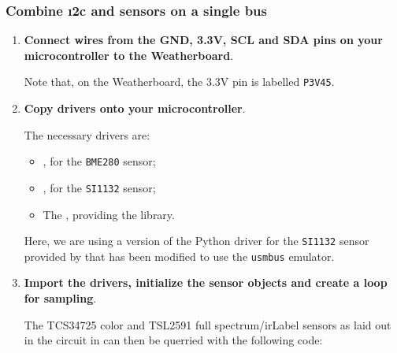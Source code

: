 \subsubsection{\howto Combine \i2c and \smbus sensors on a single bus}
\begin{enumerate}
	\item \textbf{Connect wires from the GND, 3.3V, SCL and SDA pins on your microcontroller to the Weatherboard}.

	Note that, on the Weatherboard, the 3.3V pin is labelled \texttt{P3V45}.

	\item \textbf{Copy drivers onto your microcontroller}.

	The necessary drivers are:
	\begin{itemize}
		\item {}, for the \texttt{BME280} sensor;
		\item {}, for the \texttt{SI1132} sensor;
		\item The , providing the \smbus library.
	\end{itemize}
	Here, we are using a version of the Python driver for the \texttt{SI1132} sensor provided by  that has been modified to use the \texttt{usmbus} \smbus emulator.

	\item \textbf{Import the drivers, initialize the sensor objects and create a loop for sampling}.

	The TCS34725 color and TSL2591 full spectrum/\gls{irLabel} sensors as laid out in the circuit in  can then be querried with the following code:



\end{enumerate}


